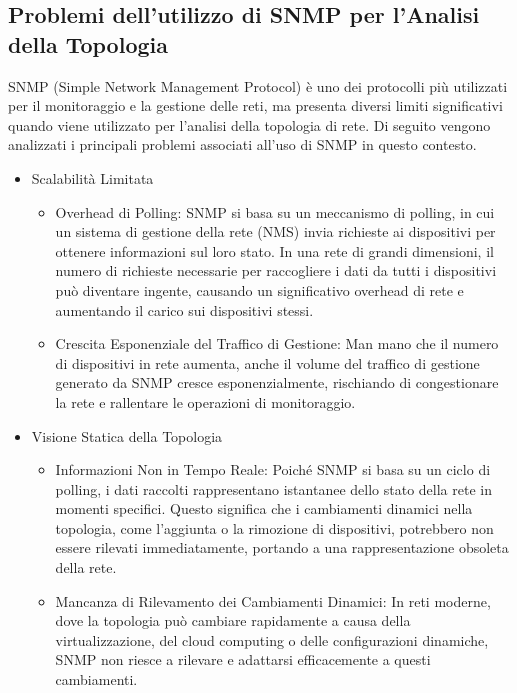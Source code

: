 \documentclass[target=bach,aauheader=,style=]{thud}
\begin{document}
\subsection{Problemi dell'utilizzo di SNMP per l'Analisi della Topologia}
SNMP (Simple Network Management Protocol) è uno dei protocolli più utilizzati per il monitoraggio e la gestione delle reti, ma presenta diversi limiti significativi quando viene utilizzato per l'analisi della topologia di rete. Di seguito vengono analizzati i principali problemi associati all'uso di SNMP in questo contesto.
\begin{itemize}

  \item Scalabilità Limitata
    \begin{itemize}
      \item Overhead di Polling: SNMP si basa su un meccanismo di polling, in cui un sistema di gestione della rete (NMS) invia richieste ai dispositivi per ottenere informazioni sul loro stato. In una rete di grandi dimensioni, il numero di richieste necessarie per raccogliere i dati da tutti i dispositivi può diventare ingente, causando un significativo overhead di rete e aumentando il carico sui dispositivi stessi.
      \item Crescita Esponenziale del Traffico di Gestione: Man mano che il numero di dispositivi in rete aumenta, anche il volume del traffico di gestione generato da SNMP cresce esponenzialmente, rischiando di congestionare la rete e rallentare le operazioni di monitoraggio.
    \end{itemize}

  \item Visione Statica della Topologia
  \begin{itemize}
      \item Informazioni Non in Tempo Reale: Poiché SNMP si basa su un ciclo di polling, i dati raccolti rappresentano istantanee dello stato della rete in momenti specifici. Questo significa che i cambiamenti dinamici nella topologia, come l'aggiunta o la rimozione di dispositivi, potrebbero non essere rilevati immediatamente, portando a una rappresentazione obsoleta della rete.
      \item Mancanza di Rilevamento dei Cambiamenti Dinamici: In reti moderne, dove la topologia può cambiare rapidamente a causa della virtualizzazione, del cloud computing o delle configurazioni dinamiche, SNMP non riesce a rilevare e adattarsi efficacemente a questi cambiamenti.
  \end{itemize}



\end{itemize}
\end{document}
